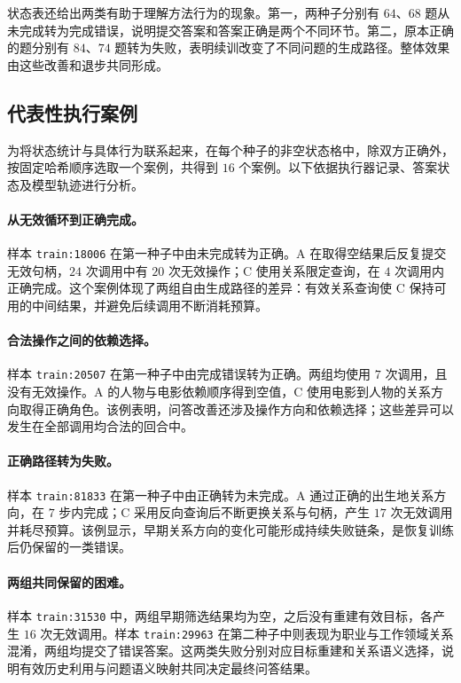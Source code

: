 状态表还给出两类有助于理解方法行为的现象。第一，两种子分别有 $64$、$68$ 题从未完成转为完成错误，说明提交答案和答案正确是两个不同环节。第二，原本正确的题分别有 $84$、$74$ 题转为失败，表明续训改变了不同问题的生成路径。整体效果由这些改善和退步共同形成。

\subsection{代表性执行案例}

为将状态统计与具体行为联系起来，在每个种子的非空状态格中，除双方正确外，按固定哈希顺序选取一个案例，共得到 $16$ 个案例。以下依据执行器记录、答案状态及模型轨迹进行分析。

\paragraph{从无效循环到正确完成。}
样本 \texttt{train:18006} 在第一种子中由未完成转为正确。A 在取得空结果后反复提交无效句柄，$24$ 次调用中有 $20$ 次无效操作；C 使用关系限定查询，在 $4$ 次调用内正确完成。这个案例体现了两组自由生成路径的差异：有效关系查询使 C 保持可用的中间结果，并避免后续调用不断消耗预算。

\paragraph{合法操作之间的依赖选择。}
样本 \texttt{train:20507} 在第一种子中由完成错误转为正确。两组均使用 $7$ 次调用，且没有无效操作。A 的人物与电影依赖顺序得到空值，C 使用电影到人物的关系方向取得正确角色。该例表明，问答改善还涉及操作方向和依赖选择；这些差异可以发生在全部调用均合法的回合中。

\paragraph{正确路径转为失败。}
样本 \texttt{train:81833} 在第一种子中由正确转为未完成。A 通过正确的出生地关系方向，在 $7$ 步内完成；C 采用反向查询后不断更换关系与句柄，产生 $17$ 次无效调用并耗尽预算。该例显示，早期关系方向的变化可能形成持续失败链条，是恢复训练后仍保留的一类错误。

\paragraph{两组共同保留的困难。}
样本 \texttt{train:31530} 中，两组早期筛选结果均为空，之后没有重建有效目标，各产生 $16$ 次无效调用。样本 \texttt{train:29963} 在第二种子中则表现为职业与工作领域关系混淆，两组均提交了错误答案。这两类失败分别对应目标重建和关系语义选择，说明有效历史利用与问题语义映射共同决定最终问答结果。

